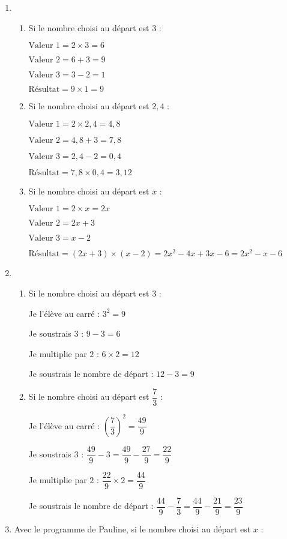 \begin{enumerate}
\item 
\begin{enumerate}
	\item Si le nombre choisi au départ est $3$ : 
	
	$\text{Valeur 1} = 2 \times 3 = 6$
	
	$\text{Valeur 2} = 6 + 3 =9$
	
	$\text{Valeur 3} = 3 - 2 = 1$
	
	$\text{Résultat} = 9 \times 1 = 9$ 
	\item Si le nombre choisi au départ est $2,4$ : 
	
	$\text{Valeur 1} = 2 \times 2,4 = 4,8$
	
	$\text{Valeur 2} = 4,8 + 3 = 7,8$
	
	$\text{Valeur 3} = 2,4 - 2 = 0,4$
	
	$\text{Résultat} = 7,8 \times 0,4 = 3,12$
	
	\item Si le nombre choisi au départ est $x$ : 
	
	$\text{Valeur 1} = 2 \times x = 2x$
	
	$\text{Valeur 2} = 2x+3$
	
	$\text{Valeur 3} = x-2$
	
	$\text{Résultat} = (2x+3)\times (x-2) = 2x^2-4x+3x-6 = 2x^2-x-6$
\end{enumerate}
\item 
\begin{enumerate}
	\item Si le nombre choisi au départ est $3$ :
	
	Je l’élève au carré : $3^2 = 9$
	
	Je soustrais $3$ : $9 - 3 = 6$
	
	Je multiplie par $2$ : $6 \times 2 = 12$
	
	Je soustrais le nombre de départ : $12 - 3 = 9$
	\item Si le nombre choisi au départ est $\dfrac{7}{3}$ :
	
	Je l’élève au carré : $\left(\dfrac{7}{3}\right)^2=\dfrac{49}{9}$
	
	Je soustrais $3$ : $ \dfrac{49}{9}-3 = \dfrac{49}{9}-\dfrac{27}{9} = \dfrac{22}{9}$
	
	Je multiplie par $2$ : $\dfrac{22}{9}\times 2 = \dfrac{44}{9}$
	
	Je soustrais le nombre de départ : $\dfrac{44}{9}-\dfrac{7}{3}=\dfrac{44}{9}-\dfrac{21}{9}=\dfrac{23}{9}$
\end{enumerate}
\item Avec le programme de Pauline, si le nombre choisi au départ est $x$ : 


\end{enumerate}

